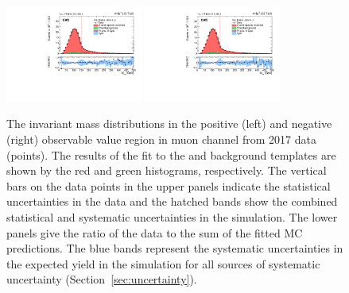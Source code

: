 \begin{figure}
    \includegraphics[width=0.4\textwidth]{figure/FitResult_17_mu_lep_tmass_obs14_p_chi2_20.pdf}
    \includegraphics[width=0.4\textwidth]{figure/FitResult_17_mu_lep_tmass_obs14_n_chi2_20.pdf}
    \caption[The \Mlb invariant mass distributions in muon channel from 2017 data.]
    {
        The \Mlb invariant mass distributions in the positive (left) and negative (right) observable value region in muon channel from 2017 data (points).
        The results of the fit to the \ttbar and background templates are shown by the red and green histograms, respectively.
        The vertical bars on the data points in the upper panels indicate the statistical uncertainties in the data and the hatched bands show the combined statistical and systematic uncertainties in the simulation.
        The lower panels give the ratio of the data to the sum of the fitted MC predictions.
        The blue bands represent the systematic uncertainties in the expected yield in the simulation for all sources of systematic uncertainty (Section~\ref{sec:uncertainty}).
    }
    \label{fig:fitting_results_17_mu}
\end{figure}
